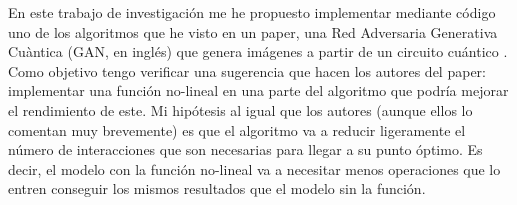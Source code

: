 En este trabajo de investigación me he propuesto implementar mediante código uno de los algoritmos que he visto en un paper, una Red Adversaria Generativa Cuàntica (GAN, en inglés) \cite{GAN2014} que genera imágenes a partir de un circuito cuántico \cite{QGAN_exp}. Como objetivo tengo verificar una sugerencia que hacen los autores del paper: implementar una función no-lineal en una parte del algoritmo que podría mejorar el rendimiento de este. Mi hipótesis al igual que los autores (aunque ellos lo comentan muy brevemente) es que el algoritmo va a reducir ligeramente el número de interacciones que son necesarias para llegar a su punto óptimo. Es decir, el modelo con la función no-lineal va a necesitar menos operaciones que lo entren conseguir los mismos resultados que el modelo sin la función.




